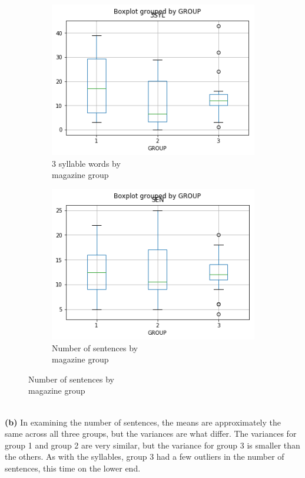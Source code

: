 \documentclass[11pt]{article}
\begin{document}
\begin{figure}[h!]
  \centering
  \begin{subfigure}[b]{0.4\linewidth}
    \includegraphics[width=\linewidth]{3syl.png}
    \caption{3 syllable words by\\magazine group}
  \end{subfigure}
  \begin{subfigure}[b]{0.4\linewidth}
    \includegraphics[width=\linewidth]{sen.png}
    \caption{Number of sentences by\\magazine group}
  \end{subfigure}
  \label{fig:coffee}
\end{figure}
\\
\textbf{(b)} In examining the number of sentences, the means are approximately the same across all three groups, but the variances are what differ. The variances for group 1 and group 2 are very similar, but the variance for group 3 is smaller than the others. As with the syllables, group 3 had a few outliers in the number of sentences, this time on the lower end.
\end{document}
